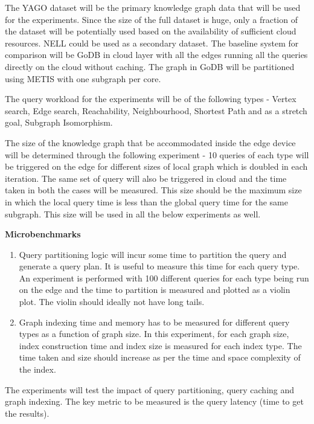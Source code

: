 \documentclass[conference]{IEEEtran}
\begin{document}
The YAGO dataset will be the primary knowledge graph data that will be used for the experiments. Since the size of the full dataset is huge, only a fraction of the dataset will be potentially used based on the availability of sufficient cloud resources. NELL\cite{Mitchell:2018:NL:3210350.3191513} could be used as a secondary dataset. The baseline system for comparison will be GoDB in cloud layer with all the edges running all the queries directly on the cloud without caching. The graph in GoDB will be partitioned using METIS with one subgraph per core.

The query workload for the experiments will be of the following types - Vertex search, Edge search, Reachability, Neighbourhood, Shortest Path and as a stretch goal, Subgraph Isomorphism. 

The size of the knowledge graph that be accommodated inside the edge device will be determined through the following experiment - 10 queries of each type will be triggered on the edge for different sizes of local graph which is doubled in each iteration. The same set of query will also be triggered in cloud and the time taken in both the cases will be measured. This size should be the maximum size in which the local query time is less than the global query time for the same subgraph. This size will be used in all the below experiments as well.

\textbf{Microbenchmarks}
\begin{enumerate}%
	\item Query partitioning logic will incur some time to partition the query and generate a query plan. It is useful to measure this time for each query type. An experiment is performed with 100 different queries for each type being run on the edge and the time to partition is measured and plotted as a violin plot. The violin should ideally not have long tails.
	\item Graph indexing time and memory has to be measured for different query types as a function of graph size. In this experiment, for each graph size, index construction time and index size is measured for each index type. The time taken and size should increase as per the time and space complexity of the index.
\end{enumerate}

The experiments will test the impact of query partitioning, query caching and graph indexing. The key metric to be measured is the query latency (time to get the results).  
\end{document}
